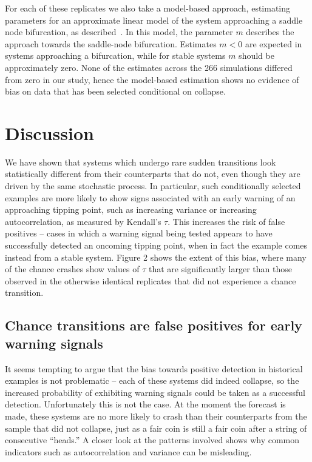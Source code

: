 \documentclass[authoryear,review,12pt]{elsarticle}
\begin{document}
For each of these replicates we also take a model-based
approach, estimating parameters for an approximate linear
model of the system approaching a saddle node bifurcation, as
described~\citet{Boettiger2012b}.  In this model, the parameter $m$
describes the approach towards the saddle-node bifurcation.  Estimates
$m < 0 $ are expected in systems approaching a bifurcation, while for
stable systems $m$ should be approximately zero. None of the estimates
across the 266 simulations differed from zero in our study, hence the
model-based estimation shows no evidence of bias on data that has been
selected conditional on collapse.



\section{Discussion}


We have shown that systems which undergo rare sudden transitions look
statistically different from their counterparts that do not, even though
they are driven by the same stochastic process.  In particular, such
conditionally selected examples are more likely to show signs associated
with an early warning of an approaching tipping point, such as increasing
variance or increasing autocorrelation, as measured by Kendall's $\tau$.
This increases the risk of false positives -- cases in which a warning
signal being tested appears to have successfully detected an oncoming
tipping point, when in fact the example comes
instead from a stable system. Figure 2 shows the extent of this bias,
where many of the chance crashes show values of $\tau$ that are 
significantly larger than those observed in the otherwise identical
replicates that did not experience a chance transition.  


\subsection{Chance transitions are false positives for early warning signals}

It seems tempting to argue that the bias towards positive detection
in historical examples is not problematic -- each of these systems did
indeed collapse, so the increased probability
of exhibiting warning signals could be taken as a successful detection.
Unfortunately this is not the case. At the moment the forecast is made,
these systems are no more likely to crash than their counterparts from
the sample that did not collapse, just as a fair coin is still a fair
coin after a string of consecutive ``heads.''  A closer look at
the patterns involved shows why common indicators
such as autocorrelation and variance can be misleading.
\end{document}
